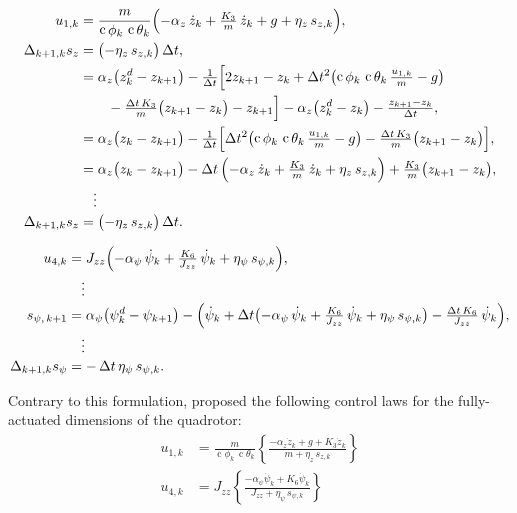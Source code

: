 \documentclass[conf]{new-aiaa}
\DeclareMathOperator{\cs}{c}
\begin{document}
\begingroup
\small
\setlength{\jot}{0.5pt}
\begin{equation}
\label{eq:sz-wrap}
\begin{aligned}
u_{1,k}
&= \frac{m}{\cs\phi_k\,\cs\theta_k}\Bigl(-\alpha_z\,\dot z_k + \tfrac{K_3}{m}\,\dot z_k + g + \eta_z\, s_{z,k}\Bigr), \\
\Delta_{k+1,k} s_{z}
&= \bigl(-\eta_z\, s_{z,k}\bigr)\,\Delta t, \\
&= \alpha_z\bigl(z_k^{d} - z_{k+1}\bigr) - \tfrac{1}{\Delta t}\Bigl[2z_{k+1} - z_k + \Delta t^{2}\bigl(\cs\phi_k\,\cs\theta_k\,\tfrac{u_{1,k}}{m} - g\bigr) \\
&\qquad - \tfrac{\Delta t\,K_3}{m}\bigl(z_{k+1} - z_k\bigr) - z_{k+1}\Bigr] - \alpha_z\bigl(z_k^{d} - z_k\bigr) - \tfrac{z_{k+1} - z_k}{\Delta t}, \\
&= \alpha_z\bigl(z_k - z_{k+1}\bigr) - \tfrac{1}{\Delta t}\Bigl[\Delta t^{2}\bigl(\cs\phi_k\,\cs\theta_k\,\tfrac{u_{1,k}}{m} - g\bigr) - \tfrac{\Delta t\,K_3}{m}\bigl(z_{k+1} - z_k\bigr)\Bigr], \\
&= \alpha_z\bigl(z_k - z_{k+1}\bigr) - \Delta t\,\Bigl(-\alpha_z\,\dot z_k + \tfrac{K_3}{m}\,\dot z_k + \eta_z\, s_{z,k}\Bigr) + \tfrac{K_3}{m}\bigl(z_{k+1} - z_k\bigr), \\[-2pt]
&\quad \vdots \\[-2pt]
\Delta_{k+1,k} s_{z} &= \bigl(-\eta_z\, s_{z,k}\bigr)\,\Delta t.
\end{aligned}
\end{equation}
\endgroup

\begingroup
\small
\setlength{\jot}{0.5pt}
\begin{equation}
\label{eq:spsi-wrap-tighter}
\begin{aligned}
u_{4,k}
&= J_{zz}\Bigl(-\alpha_\psi\,\dot\psi_k + \tfrac{K_6}{J_{zz}}\,\dot\psi_k + \eta_\psi\, s_{\psi,k}\Bigr), \\[-2pt]
&\quad \vdots \\[-2pt]
s_{\psi,\,k+1}
&= \alpha_\psi\bigl(\psi_k^{d} - \psi_{k+1}\bigr) - \Bigl(\dot\psi_k + \Delta t\bigl(-\alpha_\psi\,\dot\psi_k + \tfrac{K_6}{J_{zz}}\,\dot\psi_k + \eta_\psi\, s_{\psi,k}\bigr) - \tfrac{\Delta t\,K_6}{J_{zz}}\,\dot\psi_k\Bigr), \\[-2pt]
&\quad \vdots \\[-2pt]
\Delta_{k+1,k}s_{\psi}
&= -\,\Delta t\, \eta_\psi\, s_{\psi,k}.
\end{aligned}
\end{equation}
\endgroup

Contrary to this formulation, \cite{refs:Xiong2016} proposed the following control laws for the fully-actuated dimensions of the quadrotor:
\begin{align}
u_{1,k} &= \frac{m}{\cs\phi_k\,\cs\theta_k}
\left\{ \frac{-\alpha_z \dot z_k + g + K_3 \dot z_k}{m + \eta_z\, s_{z,k}} \right\} \\[2pt]
u_{4,k} &= J_{zz}
\left\{ \frac{-\alpha_\psi \dot\psi_k + K_6 \dot\psi_k}{J_{zz} + \eta_\psi\, s_{\psi,k}} \right\}
\end{align}
\end{document}
